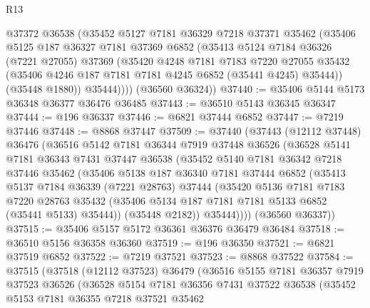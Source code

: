 \begin{lexlean}{R13}
\begin{coremodule}
          @37372
          @36538
          (@35452
            @5127
            @7181
            @36329
            @7218
            @37371
            @35462
            (@35406
              @5125
              @187
              @36327
              @7181
              @37369
              @6852
              (@35413
                @5124
                @7184
                @36326
                (@7221 @27055)
                @37369
                (@35420
                  @4248
                  @7181
                  @7183
                  @7220
                  @27055
                  @35432
                  (@35406 @4246 @187 @7181 @7181 @4245 @6852 (@35441 @4245) @35444))
                (@35448 @1880))
              @35444))))
      (@36560 @36324))
@37440 := @35406 @5144 @5173 @36348 @36377 @36476 @36485
@37443 := @36510 @5143 @36345 @36347
@37444 := @196 @36337
@37446 := @6821 @37444 @6852
@37447 := @7219 @37446
@37448 := @8868 @37447
@37509 := @37440
    (@37443
      (@12112 @37448)
      @36476
      (@36516
        @5142
        @7181
        @36344
        @7919
        @37448
        @36526
        (@36528
          @5141
          @7181
          @36343
          @7431
          @37447
          @36538
          (@35452
            @5140
            @7181
            @36342
            @7218
            @37446
            @35462
            (@35406
              @5138
              @187
              @36340
              @7181
              @37444
              @6852
              (@35413
                @5137
                @7184
                @36339
                (@7221 @28763)
                @37444
                (@35420
                  @5136
                  @7181
                  @7183
                  @7220
                  @28763
                  @35432
                  (@35406 @5134 @187 @7181 @7181 @5133 @6852 (@35441 @5133) @35444))
                (@35448 @2182))
              @35444))))
      (@36560 @36337))
@37515 := @35406 @5157 @5172 @36361 @36376 @36479 @36484
@37518 := @36510 @5156 @36358 @36360
@37519 := @196 @36350
@37521 := @6821 @37519 @6852
@37522 := @7219 @37521
@37523 := @8868 @37522
@37584 := @37515
    (@37518
      (@12112 @37523)
      @36479
      (@36516
        @5155
        @7181
        @36357
        @7919
        @37523
        @36526
        (@36528
          @5154
          @7181
          @36356
          @7431
          @37522
          @36538
          (@35452
            @5153
            @7181
            @36355
            @7218
            @37521
            @35462

\end{coremodule}
\end{lexlean}
